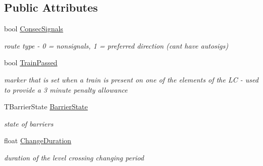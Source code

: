 \subsection*{Public Attributes}
\begin{DoxyCompactItemize}
\item 
\mbox{\label{class_t_track_1_1_t_active_level_crossing_ab673508a424b72287259591f31e309fd}} 
bool \mbox{\hyperlink{class_t_track_1_1_t_active_level_crossing_ab673508a424b72287259591f31e309fd}{Consec\+Signals}}
\begin{DoxyCompactList}\small\item\em route type -\/ 0 = nonsignals, 1 = preferred direction (can\textquotesingle{}t have autosigs) \end{DoxyCompactList}\item 
\mbox{\label{class_t_track_1_1_t_active_level_crossing_a1cdc06cbcf27faf07f7a653a51cd661e}} 
bool \mbox{\hyperlink{class_t_track_1_1_t_active_level_crossing_a1cdc06cbcf27faf07f7a653a51cd661e}{Train\+Passed}}
\begin{DoxyCompactList}\small\item\em marker that is set when a train is present on one of the elements of the LC -\/ used to provide a 3 minute penalty allowance \end{DoxyCompactList}\item 
\mbox{\label{class_t_track_1_1_t_active_level_crossing_ae6a3eed6fc68f1e65a59a3da36a3d4cb}} 
T\+Barrier\+State \mbox{\hyperlink{class_t_track_1_1_t_active_level_crossing_ae6a3eed6fc68f1e65a59a3da36a3d4cb}{Barrier\+State}}
\begin{DoxyCompactList}\small\item\em state of barriers \end{DoxyCompactList}\item 
\mbox{\label{class_t_track_1_1_t_active_level_crossing_af45c2e8c0f427b23e655cdce00cebbb8}} 
float \mbox{\hyperlink{class_t_track_1_1_t_active_level_crossing_af45c2e8c0f427b23e655cdce00cebbb8}{Change\+Duration}}
\begin{DoxyCompactList}\small\item\em duration of the level crossing changing period \end{DoxyCompactList}\item 

\end{DoxyCompactItemize}
